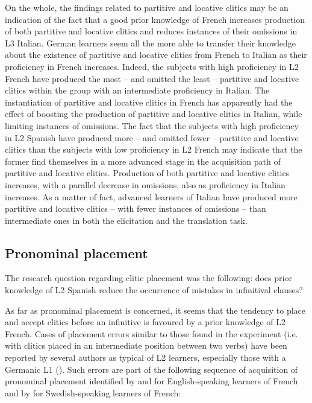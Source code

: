 \documentclass[output=paper,modfonts,nonflat,newtxmath]{langsci/langscibook}
\begin{document}
On the whole, the findings related to partitive and locative clitics may be an indication of the fact that a good prior knowledge of French increases production of both partitive and locative clitics and reduces instances of their omissions in L3 Italian. German learners seem all the more able to transfer their knowledge about the existence of partitive and locative clitics from French to Italian as their proficiency in French increases. Indeed, the subjects with high proficiency in L2 French have produced the most – and omitted the least – partitive and locative clitics within the group with an intermediate proficiency in Italian. The instantiation of partitive and locative clitics in French has apparently had the effect of boosting the production of partitive and locative clitics in Italian, while limiting instances of omissions. The fact that the subjects with high proficiency in L2 Spanish have produced more – and omitted fewer – partitive and locative clitics than the subjects with low proficiency in L2 French may indicate that the former find themselves in a more advanced stage in the acquisition path of partitive and locative clitics. Production of both partitive and locative clitics increases, with a parallel decrease in omissions, also as proficiency in Italian increases. As a matter of fact, advanced learners of Italian have produced more partitive and locative clitics – with fewer instances of omissions – than intermediate ones in both the elicitation and the translation task.

\subsection{Pronominal placement} %
\label{sec:sciutti:5.2}

The research question regarding clitic placement was the following: does prior knowledge of L2 Spanish reduce the occurrence of mistakes in infinitival clauses?

As far as pronominal placement is concerned, it seems that the tendency to place and accept clitics before an infinitive is favoured by a prior knowledge of L2 French. Cases of placement errors similar to those found in the experiment (i.e. with clitics placed in an intermediate position between two verbs) have been reported by several authors as typical of L2 learners, especially those with a Germanic L1 (\citealt{GundelTarone1983, ConnorsNuckle1986, Zobl1992, TowellHawkins1994, GrondinWhite1996,  HulkMuller2000, Herschensohn2004, Ferrari2006, Maffei2009, Corino2012}). Such errors are part of the following sequence of acquisition of pronominal placement identified by \citet{TowellHawkins1994} and \citet{Herschensohn2004} for English-speaking learners of French and by \citet{Schlyter1997} for Swedish-speaking learners of French:
\end{document}
